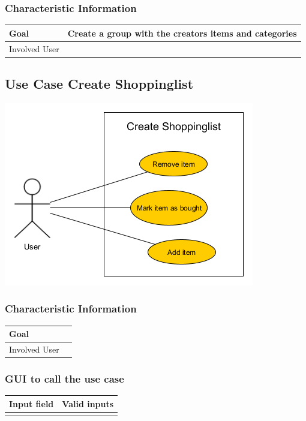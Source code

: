 \documentclass[12pt]{article}
\theoremstyle{definition}
\begin{document}
\subsubsection{Characteristic Information}

\begin{tabular}{|l|l|}
\hline
Goal &  Create a group with the creators items and categories\\ \hline
Involved User &  \\ \hline
\end{tabular}

\subsection{Use Case Create Shoppinglist}

\includegraphics[scale=.5]{UseCaseCreateShoppinglist.png}\\


\subsubsection{Characteristic Information}

\begin{tabular}{|l|l|}
\hline
Goal &  \\ \hline
Involved User &  \\ \hline
\end{tabular}


\subsubsection{GUI to call the use case}

\begin{tabular}{|l|l|}
\hline
Input field & Valid inputs \\ \hline
 &  \\ \hline
\end{tabular}
\end{document}
